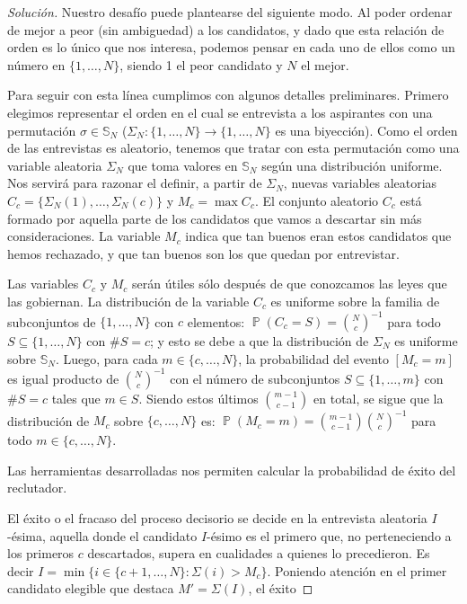 \documentclass{article}
\DeclareMathOperator{\prob}{\mathbb{P}}
\newcommand{\symmetric}{\mathbb{S}}
\theoremstyle{definition}
\begin{document}
\begin{proof}[Solución]
Nuestro desafío puede plantearse del siguiente modo.
Al poder ordenar de mejor a peor (sin ambiguedad) a los candidatos, y dado que esta relación de orden es lo único que nos interesa, podemos pensar en cada uno de ellos como un número en $\{1, \dots, N\}$, siendo 1 el peor candidato y $N$ el mejor.

Para seguir con esta línea cumplimos con algunos detalles preliminares.
Primero elegimos representar el orden en el cual se entrevista a los aspirantes con una permutación $\sigma \in \symmetric_N$ ($\Sigma_N : \{1, \dots, N\} \rightarrow \{1, \dots, N\}$ es una biyección).
Como el orden de las entrevistas es aleatorio, tenemos que tratar con esta permutación como una variable aleatoria $\Sigma_N$ que toma valores en $\symmetric_N$ según una distribución uniforme.
Nos servirá para razonar el definir, a partir de $\Sigma_N$, nuevas variables aleatorias $C_c = \{\Sigma_N(1), \dots, \Sigma_N(c)\}$ y $M_c = \max C_c$.
El conjunto aleatorio $C_c$ está formado por aquella parte de los candidatos que vamos a descartar sin más consideraciones.
La variable $M_c$ indica que tan buenos eran estos candidatos que hemos rechazado, y que tan buenos son los que quedan por entrevistar.

Las variables $C_c$ y $M_c$ serán útiles sólo después de que conozcamos las leyes que las gobiernan.
La distribución de la variable $C_c$ es uniforme sobre la familia de subconjuntos de $\{1, \dots, N\}$ con $c$ elementos:
$\prob(C_c = S) = \binom{N}{c}^{- 1}$ para todo $S \subseteq \{1, \dots, N\}$ con $\# S = c$; y esto se debe a que la distribución de $\Sigma_N$ es uniforme sobre $\symmetric_N$.
Luego, para cada $m \in \{c, \dots, N\}$, la probabilidad del evento $[M_c = m]$ es igual producto de $\binom{N}{c}^{- 1}$ con el número de subconjuntos $S \subseteq \{1, \dots, m\}$ con $\# S = c$ tales que $m \in S$.
Siendo estos últimos $\binom{m - 1}{c - 1}$ en total, se sigue que la distribución de $M_c$ sobre $\{c, \dots, N\}$ es: $\prob(M_c = m) = \binom{m - 1}{c - 1} \binom{N}{c}^{- 1}$ para todo $m \in \{c, \dots, N\}$.

Las herramientas desarrolladas nos permiten calcular la probabilidad de éxito del reclutador.

El éxito o el fracaso del proceso decisorio se decide en la entrevista aleatoria $I$-ésima, aquella donde el candidato $I$-ésimo es el primero que, no perteneciendo a los primeros $c$ descartados, supera en cualidades a quienes lo precedieron.
Es decir $I = \min \{i \in \{c + 1, \dots, N\} : \Sigma(i) > M_c\}$.
Poniendo atención en el primer candidato elegible que destaca $M' = \Sigma(I)$, el éxito
\end{proof}
\end{document}
